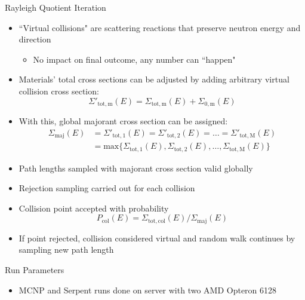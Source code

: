 \documentclass[final]{beamer}
\begin{document}
\begin{frame}{}
\begin{columns}[t]
      	\begin{column}{.3\linewidth}
            \begin{block}{Rayleigh Quotient Iteration}
	\begin{itemize}
	\item{``Virtual collisions" are scattering reactions that preserve neutron energy and direction}
		\begin{itemize}
		\item{No impact on final outcome, any number can ``happen"}
		\end{itemize}
	\item{Materials' total cross sections can be adjusted by adding arbitrary virtual collision cross section:}
		\begin{equation*}
		\Sigma'_{\mathrm{tot,m}}(E) = \Sigma_{\mathrm{tot,m}}(E) + \Sigma_{\mathrm{0,m}}(E)
		\end{equation*}
	\item{With this, global majorant cross section can be assigned:}
		\begin{equation*}
		\begin{aligned}
		\Sigma_{\mathrm{maj}}(E) &=\Sigma'_{\mathrm{tot,1}}(E) = \Sigma'_{\mathrm{tot,2}}(E) = \ldots = \Sigma'_{\mathrm{tot,M}}(E) \\
		& = \mathrm{max}\{\Sigma_{\mathrm{tot,1}}(E), \Sigma_{\mathrm{tot,2}}(E),\ldots, \Sigma_{\mathrm{tot,M}}(E)\}
		\end{aligned}
		\end{equation*}
		\item{Path lengths sampled with majorant cross section valid globally}
		\item{Rejection sampling carried out for each collision}
		\item{Collision point accepted with probability}
		\begin{equation*} 
		P_{\mathrm{col}}(E) = \Sigma_{\mathrm{tot,col}}(E)/\Sigma_{\mathrm{maj}}(E)
		\end{equation*}
		\item{If point rejected, collision considered virtual and random walk 
		continues by sampling new path length \cite{serpent}}
	\end{itemize}
            \end{block}
		\vfill
        	\begin{block}{\large Run Parameters}
          		\begin{itemize}
			\item{MCNP and Serpent runs done on server with two AMD Opteron 6128 
}
\end{itemize}
\end{block}
\end{column}
\end{columns}
\end{frame}
\end{document}
